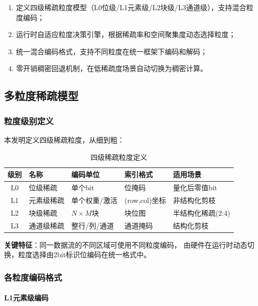 \documentclass[a4paper,12pt,fontset=ubuntu]{ctexart}
\begin{document}
\begin{enumerate}
  \item 定义四级稀疏粒度模型（L0位级/L1元素级/L2块级/L3通道级），支持混合粒度编码；
  \item 运行时自适应粒度决策引擎，根据稀疏率和空间聚集度动态选择粒度；
  \item 统一混合编码格式，支持不同粒度在统一框架下编码和解码；
  \item 零开销稠密回退机制，在低稀疏度场景自动切换为稠密计算。
\end{enumerate}

\subsection{多粒度稀疏模型}

\subsubsection{粒度级别定义}

本发明定义四级稀疏粒度，从细到粗：

\begin{table}[htbp]
\centering
\caption{四级稀疏粒度定义}
\begin{tabular}{cllll}
\toprule
\textbf{级别} & \textbf{名称} & \textbf{编码单位} & \textbf{索引格式} & \textbf{适用场景} \\
\midrule
L0 & 位级稀疏 & 单个bit & 位掩码 & 量化后零值bit \\
L1 & 元素级稀疏 & 单个权重/激活 & (row,col)坐标 & 非结构化剪枝 \\
L2 & 块级稀疏 & $N \times M$块 & 块位图 & 半结构化稀疏(2:4) \\
L3 & 通道级稀疏 & 整行/列/通道 & 通道掩码 & 结构化剪枝 \\
\bottomrule
\end{tabular}
\end{table}

\textbf{关键特征}：同一数据流的不同区域可使用不同粒度编码，
由硬件在运行时动态切换，粒度选择由2bit标识位编码在统一格式中。

\subsubsection{各粒度编码格式}

\paragraph{L1元素级编码}
\end{document}
